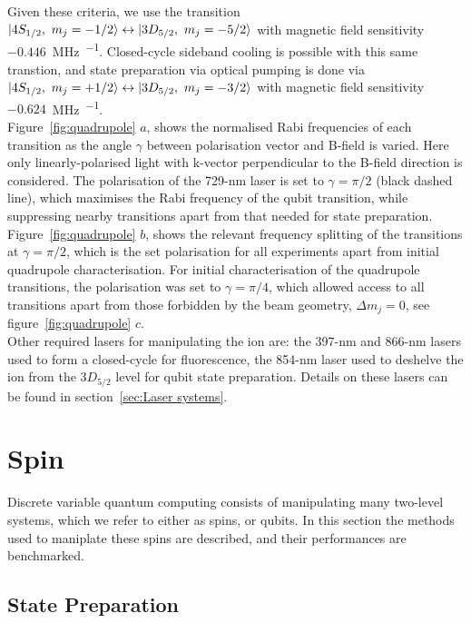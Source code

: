     Given these criteria, we use the transition $\ket{4S_{1/2},~m_j = -1/2} \leftrightarrow \ket{3D_{5/2},~m_j = -5/2}$ with magnetic field sensitivity 
    $-0.446$~\unit{\MHz\per\gauss}. Closed-cycle sideband cooling is possible with this same transtion, and state preparation via optical pumping is done via $\ket{4S_{1/2},~m_j = +1/2} \leftrightarrow \ket{3D_{5/2},~m_j = -3/2}$ with magnetic field sensitivity $-0.624$~\unit{\MHz\per\gauss}. \\
    Figure~\ref{fig:quadrupole} $a$, shows the normalised Rabi frequencies of each transition as the angle $\gamma$ between polarisation vector and B-field is varied. Here only linearly-polarised light with k-vector perpendicular to the B-field direction is considered.
    The polarisation of the 729-nm laser is set to $\gamma = \pi/2$ (black dashed line), which maximises the Rabi frequency of the qubit transition, while suppressing nearby transitions apart from that needed for state preparation. 
    Figure~\ref{fig:quadrupole} $b$, shows the relevant frequency splitting of the transitions at $\gamma = \pi/2$, which is the set polarisation for all experiments apart from initial quadrupole characterisation.
    For initial characterisation of the quadrupole transitions, the polarisation was set to $\gamma = \pi/4$, which allowed access to all transitions apart from those forbidden by the beam geometry, $\Delta m_j = 0$, see figure~\ref{fig:quadrupole} $c$. \\
    Other required lasers for manipulating the ion are: the 397-nm and 866-nm lasers used to form a closed-cycle for fluorescence, the 854-nm laser used to deshelve the ion from the $3D_{5/2}$ level for qubit state preparation. Details on these lasers can be found in section~\ref{sec:Laser systems}.
    

\section{Spin}
\label{sec:Spin}
    Discrete variable quantum computing consists of manipulating many two-level
    systems, which we refer to either as spins, or qubits. In this section 
    the methods used to maniplate these spins are described, and their
    performances are benchmarked.\\

\subsection{State Preparation}
\label{sec:Stateprep}

